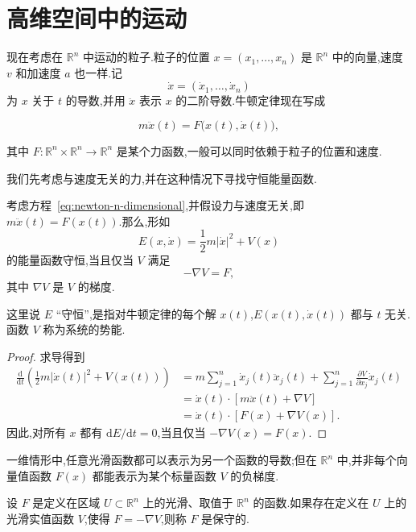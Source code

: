 \section{高维空间中的运动}

现在考虑在 $\mathbb{R}^{n}$ 中运动的粒子.粒子的位置 $x=(x_{1},\ldots,x_{n})$ 是 $\mathbb{R}^{n}$ 中的向量,速度 $v$ 和加速度 $a$ 也一样.记
\[
  \dot{x}=(\dot{x}_{1},\ldots,\dot{x}_{n})
\]
为 $x$ 关于 $t$ 的导数,并用 $\ddot{x}$ 表示 $x$ 的二阶导数.牛顿定律现在写成

\begin{equation}
  m\ddot{x}(t)=F\bigl(x(t),\dot{x}(t)\bigr),
  \label{eq:newton-n-dimensional}
\end{equation}

其中 $F:\mathbb{R}^{n}\times\mathbb{R}^{n}\to\mathbb{R}^{n}$ 是某个力函数,一般可以同时依赖于粒子的位置和速度.

我们先考虑与速度无关的力,并在这种情况下寻找守恒能量函数.

\begin{proposition}[高维中的能量守恒]\label{pro:n-dimensional-energy}
考虑方程~\eqref{eq:newton-n-dimensional},并假设力与速度无关,即 $m\ddot{x}(t)=F(x(t))$.那么,形如
\[
  E(x,\dot{x})=\frac12m\lvert\dot{x}\rvert^{2}+V(x)
\]
的能量函数守恒,当且仅当 $V$ 满足
\[
  -\nabla V=F,
\]
其中 $\nabla V$ 是 $V$ 的梯度.
\end{proposition}

这里说 $E$ “守恒”,是指对牛顿定律的每个解 $x(t)$,$E(x(t),\dot{x}(t))$ 都与 $t$ 无关.函数 $V$ 称为系统的势能.

\begin{proof}
求导得到
\begin{align*}
\frac{\mathrm{d}}{\mathrm{d}t}\left(\frac12m\lvert\dot{x}(t)\rvert^{2}+V(x(t))\right)
 &=m\sum_{j=1}^{n}\dot{x}_{j}(t)\ddot{x}_{j}(t)+\sum_{j=1}^{n}\frac{\partial V}{\partial x_{j}}\dot{x}_{j}(t)\\
 &=\dot{x}(t)\cdot\left[m\ddot{x}(t)+\nabla V\right]\\
 &=\dot{x}(t)\cdot\left[F(x)+\nabla V(x)\right].
\end{align*}
因此,对所有 $x$ 都有 $\mathrm{d}E/\mathrm{d}t=0$,当且仅当 $-\nabla V(x)=F(x)$.
\end{proof}

一维情形中,任意光滑函数都可以表示为另一个函数的导数;但在 $\mathbb{R}^{n}$ 中,并非每个向量值函数 $F(x)$ 都能表示为某个标量函数 $V$ 的负梯度.

\begin{definition}[保守力场]\label{def:conservative-field}
设 $F$ 是定义在区域 $U\subset\mathbb{R}^{n}$ 上的光滑、取值于 $\mathbb{R}^{n}$ 的函数.如果存在定义在 $U$ 上的光滑实值函数 $V$,使得 $F=-\nabla V$,则称 $F$ 是保守的.
\end{definition}


